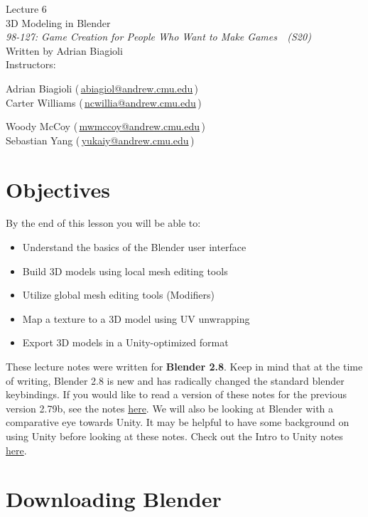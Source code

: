 \documentclass[11pt]{article}
\makeatletter
\newcommand{\lecturenum}{6}
\newcommand{\lecturename}{3D Modeling in Blender}
\newcommand{\authorname}{Adrian Biagioli}
\newcommand{\coursenum}{98-127}
\newcommand{\coursename}{Game Creation for People Who Want to Make Games}
\newcommand{\coursesem}{S20}
\newcommand{\instructors}{\begin{minipage}[t]{0.4\columnwidth}\centering Adrian Biagioli (\,\href{mailto:abiagiol@andrew.cmu.edu}{abiagiol@andrew.cmu.edu}\,) \\ Carter Williams (\,\href{mailto:ncwillia@andrew.cmu.edu}{ncwillia@andrew.cmu.edu}\,)\end{minipage}
\begin{minipage}[t]{0.4\columnwidth}\centering Woody McCoy (\,\href{mailto:mwmccoy@andrew.cmu.edu}{mwmccoy@andrew.cmu.edu}\,) \\ Sebastian Yang (\,\href{mailto:yukaiy@andrew.cmu.edu}{yukaiy@andrew.cmu.edu}\,)\end{minipage}}
\makeatother
\begin{document}
\thispagestyle{plain}
{
    \vspace{1.5em}
    \begin{center}
    {
        \huge
        Lecture \lecturenum \\
        \vspace{0.5em}
        \lecturename
        \vspace{0.4em}
    } \\
    {
        \it
        \coursenum: \coursename\ \ (\coursesem)
    } \\
    \vspace{1.0em}
    Written by \authorname \\
    \vspace{0.7em}
    Instructors:\\ \instructors
    \end{center}
}

\section{Objectives}

By the end of this lesson you will be able to:
\begin{itemize}
    \item Understand the basics of the Blender user interface
    \item Build 3D models using local mesh editing tools
    \item Utilize global mesh editing tools (Modifiers)
    \item Map a texture to a 3D model using UV unwrapping
    \item Export 3D models in a Unity-optimized format
\end{itemize}

\noindent These lecture notes were written for {\bf Blender 2.8}.  Keep in mind that at the time 
of writing, Blender 2.8 is new and has radically changed the standard blender keybindings. If you
would like to read a version of these notes for the previous version 2.79b, see the notes
\href{http://stage.gamecreation.org/StuCo/lectures/lec06_blender279.pdf}{here}.  We will also
be looking at Blender with a comparative eye towards Unity.  It may be helpful to have
some background on using Unity before looking at these notes.  Check out the Intro to Unity notes
\href{http://stage.gamecreation.org/StuCo/lectures/lec02.pdf}{here}.

\section{Downloading Blender}
\end{document}
